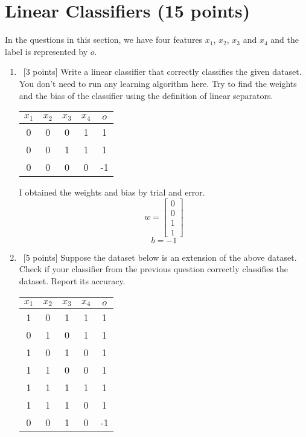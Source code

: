 \section{Linear Classifiers (15 points)}
\label{sec:q1}

In the questions in this section, we have four features $x_1$, $x_2$,
$x_3$ and $x_4$ and the label is represented by $o$.

\begin{enumerate}
\item ~[3 points] Write a linear classifier that correctly classifies the given dataset. You don't need to run any learning algorithm here. Try to find the weights and the bias of the classifier using the definition of linear separators.
  \begin{center}
    \begin{tabular}{cccc|c}
      $x_1$ & $x_2$ & $x_3$ & $x_4$ & $o$ \\ \hline
      0 & 0 & 0 & 1 & 1 \\
      0 & 0 & 1 & 1 & 1 \\
      0 & 0 & 0 & 0 & -1 \\
    \end{tabular}
  \end{center}

I obtained the weights and bias by trial and error. 
  \begin{equation*}
     w=\begin{bmatrix}
         0\\
         0 \\
         1\\
         1
        \end{bmatrix}
  \end{equation*}
  $$
  b=-1
  $$
\item ~[5 points] Suppose the dataset below is an extension of the above dataset. Check if your classifier from the previous question correctly classifies the dataset. Report its accuracy.
  \begin{center}
    \begin{tabular}{cccc|c}
      $x_1$ & $x_2$ & $x_3$ & $x_4$ & $o$ \\ \hline
      1 & 0 & 1 & 1 & 1 \\
      0 & 1 & 0 & 1 & 1 \\
      1 & 0 & 1 & 0 & 1 \\
      1 & 1 & 0 & 0 & 1 \\
      1 & 1 & 1 & 1 & 1 \\
      1 & 1 & 1 & 0 & 1 \\
      0 & 0 & 1 & 0 & -1 \\
    \end{tabular}
  \end{center}


\end{enumerate}
